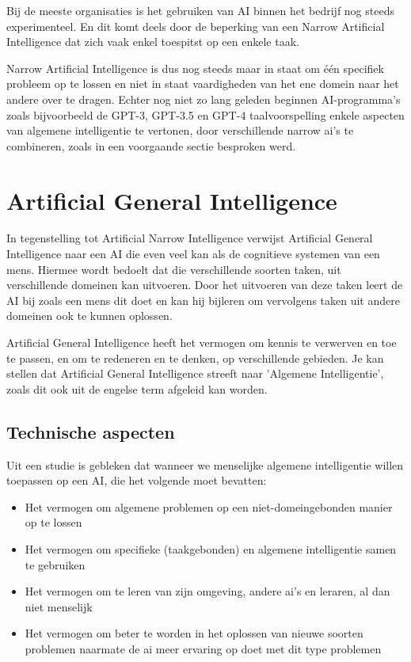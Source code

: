 Bij de meeste organisaties is het gebruiken van AI binnen het bedrijf nog steeds experimenteel. En dit komt deels door de beperking van een Narrow Artificial Intelligence dat zich vaak enkel toespitst op een enkele taak.

Narrow Artificial Intelligence is dus nog steeds maar in staat om één specifiek probleem op te lossen en niet in staat vaardigheden van het ene domein naar het andere over te dragen. Echter nog niet zo lang geleden beginnen AI-programma’s zoals bijvoorbeeld de GPT-3, GPT-3.5 en GPT-4 taalvoorspelling enkele aspecten van algemene intelligentie te vertonen, door verschillende narrow ai's te combineren, zoals in een voorgaande sectie besproken werd.

\autocite{benbya2020artificial}

\section{Artificial General Intelligence}

In tegenstelling tot Artificial Narrow Intelligence verwijst Artificial General Intelligence naar een AI die even veel kan als de cognitieve systemen van een mens. Hiermee wordt bedoelt dat die verschillende soorten taken, uit verschillende domeinen kan uitvoeren. Door het uitvoeren van deze taken leert de AI bij zoals een mens dit doet en kan hij bijleren om vervolgens taken uit andere domeinen ook te kunnen oplossen. 

Artificial General Intelligence heeft het vermogen om kennis te verwerven en toe te passen, en om te redeneren en te denken, op verschillende gebieden. Je kan stellen dat Artificial General Intelligence streeft naar 'Algemene Intelligentie', zoals dit ook uit de engelse term afgeleid kan worden. 

\subsection{Technische aspecten}

Uit een studie is gebleken dat wanneer we menselijke algemene intelligentie willen toepassen op een AI, die het volgende moet bevatten: \linebreak

\begin{itemize}
    \item Het vermogen om algemene problemen op een niet-domeingebonden manier op te lossen
    \item Het vermogen om specifieke (taakgebonden) en algemene intelligentie samen te gebruiken
    \item Het vermogen om te leren van zijn omgeving, andere ai's en leraren, al dan niet menselijk
    \item Het vermogen om beter te worden in het oplossen van nieuwe soorten problemen naarmate de ai meer ervaring op doet met dit type problemen
\end{itemize}

